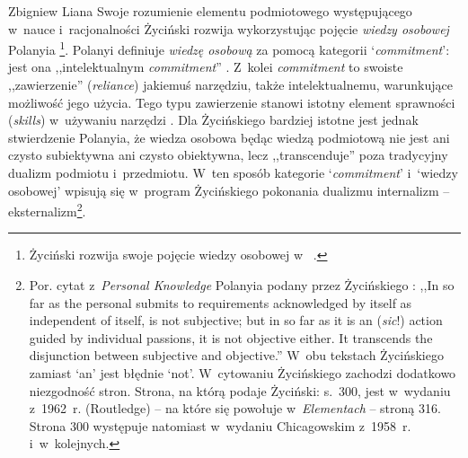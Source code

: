 \begin{artplenv}{Zbigniew Liana}
Swoje rozumienie elementu podmiotowego występującego w~nauce i~racjonalności Życiński rozwija wykorzystując pojęcie \textit{wiedzy osobowej} Polanyia
\parencite*[][]{polanyi_personal_1962}%
\footnote{Życiński rozwija swoje pojęcie wiedzy osobowej w~
\parencites[][s.~179–187]{zycinski_elementy_1996}[][s.~243–254]{zycinski_elementy_2015}.%
}. Polanyi definiuje \textit{wiedzę osobową} za pomocą kategorii ‘\textit{commitment}': jest ona ,,intelektualnym \textit{commitment}'' 
\parencite[][s.~IV]{polanyi_personal_1962}. %
 Z~kolei \textit{commitment} to swoiste ,,zawierzenie'' (\textit{reliance}) jakiemuś narzędziu, także intelektualnemu, warunkujące możliwość jego użycia. Tego typu zawierzenie stanowi istotny element sprawności (\textit{skills}) w~używaniu narzędzi 
\parencite[][s.~63]{polanyi_personal_1962}. %
 Dla Życińskiego bardziej istotne jest jednak stwierdzenie Polanyia, że wiedza osobowa będąc wiedzą podmiotową nie jest ani czysto subiektywna ani czysto obiektywna, lecz ,,transcenduje'' poza tradycyjny dualizm podmiotu i~przedmiotu. W~ten sposób kategorie ‘\textit{commitment}' i~‘wiedzy osobowej' wpisują się w~program Życińskiego pokonania dualizmu internalizm -- eksternalizm\footnote{Por. cytat z~\textit{Personal Knowledge} Polanyia podany przez Życińskiego 
\parencites[][s.~183, przypis 276]{zycinski_elementy_1996}[][s.~249, przypis 11]{zycinski_elementy_2015}: %
 ,,In so far as the personal submits to requirements acknowledged by itself as independent of itself, is not subjective; but in so far as it is an (\textit{sic}!) action guided by individual passions, it is not objective either. It transcends the disjunction between subjective and objective.'' W~obu tekstach Życińskiego zamiast ‘an' jest błędnie ‘not'. W~cytowaniu Życińskiego zachodzi dodatkowo niezgodność stron. Strona, na którą podaje Życiński: s.~300, jest w~wydaniu z~1962~r. (Routledge) -- na które się powołuje w~\textit{Elementach} -- stroną 316. Strona 300 występuje natomiast w~wydaniu Chicagowskim z~1958~r. i~w~kolejnych.}.


\end{artplenv}
